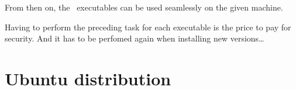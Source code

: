 From then on, the \mf\ executables can be used seamlessly on the given machine.

Having to perform the preceding task for each executable is the price to pay for security. And it has to be perfomed again when installing new versions\dots


%
%
%
%
%


\section{Ubuntu distribution}

